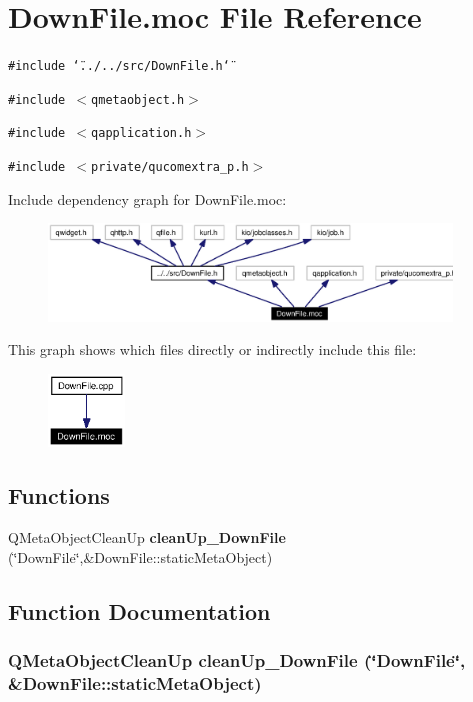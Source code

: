 \section{Down\-File.moc File Reference}
\label{DownFile_8moc}


{\tt \#include \char`\"{}../../src/Down\-File.h\char`\"{}}\par
{\tt \#include $<$qmetaobject.h$>$}\par
{\tt \#include $<$qapplication.h$>$}\par
{\tt \#include $<$private/qucomextra\_\-p.h$>$}\par


Include dependency graph for Down\-File.moc:\begin{figure}[H]
\begin{center}
\leavevmode
\includegraphics[width=304pt]{DownFile_8moc__incl}
\end{center}
\end{figure}


This graph shows which files directly or indirectly include this file:\begin{figure}[H]
\begin{center}
\leavevmode
\includegraphics[width=58pt]{DownFile_8moc__dep__incl}
\end{center}
\end{figure}
\subsection*{Functions}
\begin{CompactItemize}
\item 
QMeta\-Object\-Clean\-Up {\bf clean\-Up\_\-Down\-File} (\char`\"{}Down\-File\char`\"{},\&Down\-File::static\-Meta\-Object)
\end{CompactItemize}


\subsection{Function Documentation}
\subsubsection{\setlength{\rightskip}{0pt plus 5cm}QMeta\-Object\-Clean\-Up clean\-Up\_\-Down\-File (\char`\"{}Down\-File\char`\"{}, \&Down\-File::static\-Meta\-Object)\hspace{0.3cm}{\tt  [static]}}\label{DownFile_8moc_a0}


